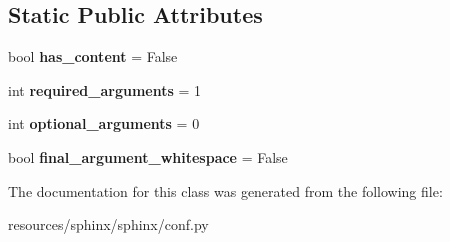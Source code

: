 \subsection*{Static Public Attributes}
\begin{DoxyCompactItemize}
\item 
bool {\bfseries has\+\_\+content} = False\hypertarget{classconf_1_1SetMode_ae1125c2c8ac3569a9e7189eaf36224ba}{}\label{classconf_1_1SetMode_ae1125c2c8ac3569a9e7189eaf36224ba}

\item 
int {\bfseries required\+\_\+arguments} = 1\hypertarget{classconf_1_1SetMode_a33f8f61daab34475f5af93e15a3e3b5d}{}\label{classconf_1_1SetMode_a33f8f61daab34475f5af93e15a3e3b5d}

\item 
int {\bfseries optional\+\_\+arguments} = 0\hypertarget{classconf_1_1SetMode_abea8b1a21182e57d44ec6d36a1beac10}{}\label{classconf_1_1SetMode_abea8b1a21182e57d44ec6d36a1beac10}

\item 
bool {\bfseries final\+\_\+argument\+\_\+whitespace} = False\hypertarget{classconf_1_1SetMode_a36cbd9320be885e5e096a5a4a3b065fd}{}\label{classconf_1_1SetMode_a36cbd9320be885e5e096a5a4a3b065fd}

\end{DoxyCompactItemize}


The documentation for this class was generated from the following file\+:\begin{DoxyCompactItemize}
\item 
resources/sphinx/sphinx/conf.\+py\end{DoxyCompactItemize}
